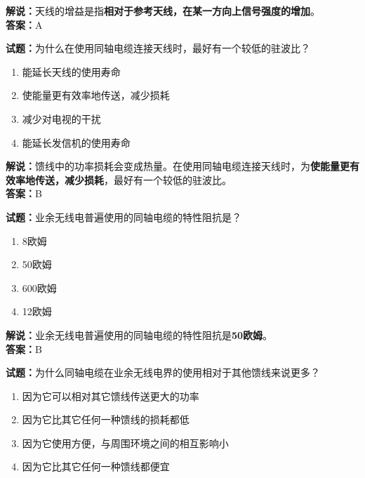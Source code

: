 \documentclass{ctexbook}
\begin{document}
\noindent\textbf{解说：}天线的增益是指\textbf{相对于参考天线，在某一方向上信号强度的增加}。\\\noindent\textbf{答案：}A

\vspace{\baselineskip}

\noindent\textbf{试题：}为什么在使用同轴电缆连接天线时，最好有一个较低的驻波比？

\begin{enumerate}[leftmargin=3em]
  \item 能延长天线的使用寿命
  \item 使能量更有效率地传送，减少损耗
  \item 减少对电视的干扰
  \item 能延长发信机的使用寿命
\end{enumerate}

\noindent\textbf{解说：}馈线中的功率损耗会变成热量。在使用同轴电缆连接天线时，为\textbf{使能量更有效率地传送，减少损耗}，最好有一个较低的驻波比。\\\noindent\textbf{答案：}B

\vspace{\baselineskip}

\noindent\textbf{试题：}业余无线电普遍使用的同轴电缆的特性阻抗是？

\begin{enumerate}[leftmargin=3em]
  \item 8欧姆
  \item 50欧姆
  \item 600欧姆
  \item 12欧姆
\end{enumerate}

\noindent\textbf{解说：}业余无线电普遍使用的同轴电缆的特性阻抗是\textbf{50欧姆}。\\\noindent\textbf{答案：}B

\vspace{\baselineskip}

\noindent\textbf{试题：}为什么同轴电缆在业余无线电界的使用相对于其他馈线来说更多？

\begin{enumerate}[leftmargin=3em]
  \item 因为它可以相对其它馈线传送更大的功率
  \item 因为它比其它任何一种馈线的损耗都低
  \item 因为它使用方便，与周围环境之间的相互影响小
  \item 因为它比其它任何一种馈线都便宜
\end{enumerate}
\end{document}
